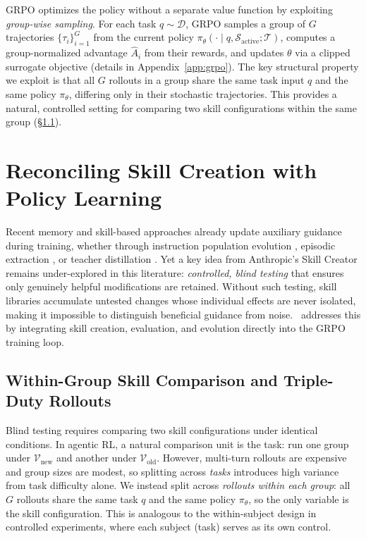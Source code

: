 \documentclass{article}
\theoremstyle{plain}
\theoremstyle{definition}
\theoremstyle{remark}
\begin{document}
GRPO \citep{shao2024deepseekmath} optimizes the policy without a separate value function by exploiting \textit{group-wise sampling}. For each task $q \sim \mathcal{D}$, GRPO samples a group of $G$ trajectories $\{\tau_i\}_{i=1}^G$ from the current policy $\pi_{\theta}(\cdot \mid q, \mathcal{S}_{\text{active}}; \mathcal{T})$, computes a group-normalized advantage $\hat{A}_i$ from their rewards, and updates $\theta$ via a clipped surrogate objective (details in Appendix~\ref{app:grpo}). The key structural property we exploit is that all $G$ rollouts in a group share the same task input $q$ and the same policy $\pi_\theta$, differing only in their stochastic trajectories. This provides a natural, controlled setting for comparing two skill configurations within the same group (\S\ref{sec:design}).


\section{Reconciling Skill Creation with Policy Learning}
\label{sec:method}

Recent memory and skill-based approaches already update auxiliary guidance during training, whether through instruction population evolution \citep{zhou2025inspo}, episodic extraction \citep{zhao2024expel}, or teacher distillation \citep{xia2025skillrl}. Yet a key idea from Anthropic's Skill Creator \citep{anthropic2025skillcreator} remains under-explored in this literature: \textit{controlled, blind testing} that ensures only genuinely helpful modifications are retained. Without such testing, skill libraries accumulate untested changes whose individual effects are never isolated, making it impossible to distinguish beneficial guidance from noise.
\ours~addresses this by integrating skill creation, evaluation, and evolution directly into the GRPO training loop.


\subsection{Within-Group Skill Comparison and Triple-Duty Rollouts}
\label{sec:design}

Blind testing requires comparing two skill configurations under identical conditions. In agentic RL, a natural comparison unit is the task: run one group under $\mathcal{V}_{\text{new}}$ and another under $\mathcal{V}_{\text{old}}$. However, multi-turn rollouts are expensive and group sizes are modest, so splitting across \textit{tasks} introduces high variance from task difficulty alone. We instead split across \textit{rollouts within each group}: all $G$ rollouts share the same task $q$ and the same policy $\pi_\theta$, so the only variable is the skill configuration. This is analogous to the within-subject design in controlled experiments, where each subject (task) serves as its own control.
\end{document}
